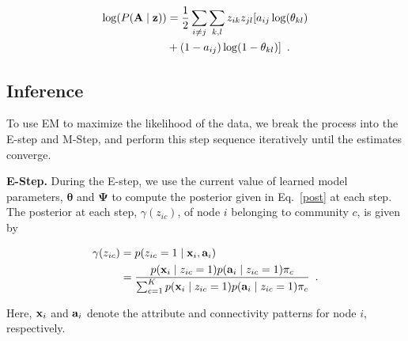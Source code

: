 \documentclass[10pt,journal,compsoc]{IEEEtran}
\begin{document}
\begin{equation}
\begin{split}
\log(P({\bf A} \mid {\bf z}))&=\frac{1}{2}\sum_{i\ne j}\sum_{k,l}z_{ik}z_{jl}[a_{ij}\log (\theta_{kl})\\
&+(1-a_{ij})\log(1-\theta_{kl})]\enspace. 
\end{split}
\end{equation}



\subsection{Inference}
To use EM to maximize the likelihood of the data, we break the process into the E-step and M-Step, and perform this step sequence iteratively until the estimates converge.

\textbf{E-Step.} During the E-step, we use the current value of learned model parameters, ${\boldsymbol \theta}$ and ${\boldsymbol \Psi}$ to compute the posterior given in Eq.~\eqref{post} at each step. The posterior at each step,  $\gamma(z_{ic})$, of node $i$ belonging to community $c$, is given by

\begin{equation}
\begin{split}
\gamma({z_{ic}})& =p(z_{ic}=1\mid {\bf x}_{i}, {\bf a}_{i}) \\
&=\frac{p({\bf x}_{i} \mid z_{ic}=1)p({\bf a}_{i}\mid z_{ic}=1)\pi_{c}}{\sum_{c=1}^{K}p({\bf x}_{i} \mid z_{ic}=1)p({\bf a}_{i}\mid z_{ic}=1)\pi_{c}}\enspace.
\end{split}
\end{equation}

Here, ${\bf x}_{i}$ and ${\bf a}_{i}$ denote the attribute and connectivity patterns for node $i$, respectively. 
\end{document}
